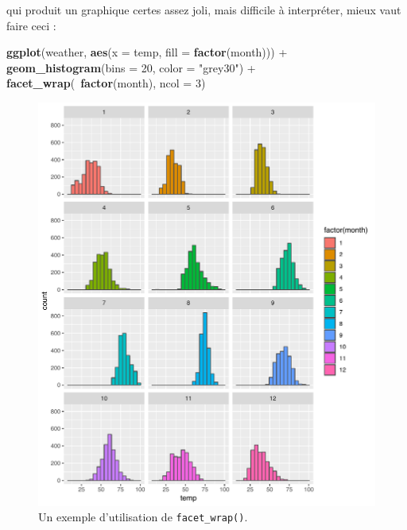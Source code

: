 \documentclass[
  a4paper,
]{article}
\newenvironment{Shaded}{\begin{snugshade}}{\end{snugshade}}
\newcommand{\DataTypeTok}[1]{\textcolor[rgb]{0.00,0.34,0.68}{#1}}
\newcommand{\DecValTok}[1]{\textcolor[rgb]{0.69,0.50,0.00}{#1}}
\newcommand{\KeywordTok}[1]{\textcolor[rgb]{0.12,0.11,0.11}{\textbf{#1}}}
\newcommand{\NormalTok}[1]{\textcolor[rgb]{0.12,0.11,0.11}{#1}}
\newcommand{\OperatorTok}[1]{\textcolor[rgb]{0.12,0.11,0.11}{#1}}
\newcommand{\StringTok}[1]{\textcolor[rgb]{0.75,0.01,0.01}{#1}}
\begin{document}
qui produit un graphique certes assez joli, mais difficile à interpréter, mieux vaut faire ceci :

\begin{Shaded}
\begin{Highlighting}[]
\KeywordTok{ggplot}\NormalTok{(weather, }\KeywordTok{aes}\NormalTok{(}\DataTypeTok{x =}\NormalTok{ temp, }\DataTypeTok{fill =} \KeywordTok{factor}\NormalTok{(month))) }\OperatorTok{+}
\StringTok{  }\KeywordTok{geom_histogram}\NormalTok{(}\DataTypeTok{bins =} \DecValTok{20}\NormalTok{, }\DataTypeTok{color =} \StringTok{"grey30"}\NormalTok{) }\OperatorTok{+}
\StringTok{  }\KeywordTok{facet_wrap}\NormalTok{(}\OperatorTok{~}\KeywordTok{factor}\NormalTok{(month), }\DataTypeTok{ncol =} \DecValTok{3}\NormalTok{)}
\end{Highlighting}
\end{Shaded}

\begin{figure}[htpb]

{\centering \includegraphics[width=0.9\linewidth]{figure/wrap-1} 

}

\caption{Un exemple d'utilisation de \texttt{facet\_wrap()}.}\label{fig:wrap}
\end{figure}
\end{document}
